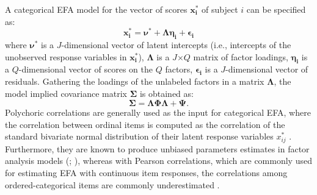 \documentclass[a4paper,man,natbib]{apa6}
\begin{document}
\begin{linenumbers}
A categorical EFA model for the vector of scores $\boldsymbol{x_{i}^{*}}$ of subject $i$ can be specified as:
\begin{equation}
\boldsymbol{x_{i}^{*}} = \boldsymbol{\nu^{*}} + \boldsymbol{\Lambda\eta_{i}} + \boldsymbol{\epsilon_{i}}
\end{equation}
where $\boldsymbol{\nu^{*}}$ is a $J$-dimensional vector of latent intercepts (i.e., intercepts of the unobserved response variables in $\boldsymbol{x_{i}^{*}}$), $\boldsymbol{\Lambda}$ is a $J$$\times$$Q$ matrix of factor loadings, $\boldsymbol{\eta_{i}}$ is a $Q$-dimensional vector of scores on the $Q$ factors, $\boldsymbol{\epsilon_{i}}$ is a $J$-dimensional vector of residuals. Gathering the loadings of the unlabeled factors in a matrix $\boldsymbol{\Lambda}$, the model implied covariance matrix $\boldsymbol{\Sigma}$ is obtained as: 
\begin{equation}
\boldsymbol{\Sigma} = \boldsymbol{\Lambda\Phi\Lambda} + \boldsymbol{\Psi}.
\end{equation}
\noindent Polychoric correlations are generally used as the input for categorical EFA, where the correlation between ordinal items is computed as the correlation of the standard bivariate normal distribution of their latent response variables $x_{ij}^{*}$ \citep{ekstrom2011generalized}. Furthermore, they are known to produce unbiased parameters estimates in factor analysis models (\citealp{babakus1987sensitivity}; \citealp{rigdon1991performance}), whereas with Pearson correlations, which are commonly used for estimating EFA with continuous item responses, the correlations among ordered-categorical items are commonly underestimated \citep{bollen1981pearson}.%




\end{linenumbers}
\end{document}
